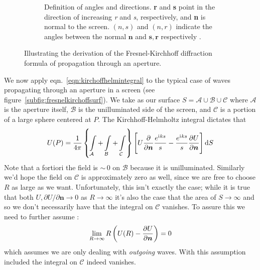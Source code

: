 \begin{figure}
\begin{subfigure}[b]{\subfigwidth}
        \caption{Definition of angles and directions. \textbf{r} and \textbf{s} point in the direction of increasing \textit{r}
        and \textit{s}, respectively, and \textbf{n} is normal to the screen. \((n,s)\) and \((n,r)\) indicate the angles between the normal \(\bm{n}\) and \(\bm{s}, \bm{r}\) respectively \cite{Ivanov2016ElementsOD}.}\label{subfig:fresnelkirchoffangles}
    \end{subfigure}
    \caption{Illustrating the derivation of the Fresnel-Kirchhoff diffraction formula of propagation through an aperture.}\label{fig:fresnelkirchoff}
\end{figure}

We now apply eqn.~\eqref{eqn:kirchoffhelmintegral} to the typical case of waves propagating through an aperture in a screen (see figure~\ref{subfig:fresnelkirchoffsurf}).
%
We take as our surface \(S = \mathcal{A} \cup \mathcal{B} \cup \mathcal{C}\) where \(\mathcal{A}\) is the aperture itself, \(\mathcal{B}\) is the unilluminated side of the screen, and \(\mathcal{C}\) is a portion of a large sphere centered at \(P\).
%
The Kirchhoff-Helmholtz integral dictates that 
%
\begin{equation}
    U(P) = \frac{1}{4 \pi} \left\{ \int\limits_{\mathcal{A}}  + \int\limits_{\mathcal{B}} + \int\limits_{\mathcal{C}}  \right\} \left[ U \pdv{}{\bm{n}} \frac{e^{\iu k s}}{s} - \frac{e^{\iu k s}}{s} \pdv{U}{\bm{n}} \right] \dif S
\end{equation}
%
Note that a fortiori the field is \(\sim\,\)0 on \(\mathcal{B}\) because it is unilluminated.
%
Similarly we'd hope the field on \(\mathcal{C}\) is approximately zero as well, since we are free to choose \(R\) as large as we want.
%
Unfortunately, this isn't exactly the case; while it is true that both \(U, \partial U/ \partial \bm{n} \rightarrow 0\) as \(R \rightarrow \infty\) it's also the case that the area of \(S \rightarrow \infty\) and so we don't necessarily have that the integral on \(\mathcal{C}\) vanishes.
%
To assure this we need to further assume :
%
\begin{equation}
    \lim_{R \rightarrow \infty} R \left( U(R) - \pdv{U}{\bm{n}} \right)  = 0
\end{equation}
%
which assumes we are only dealing with \textit{outgoing} waves.
%
With this assumption included the integral on \(\mathcal{C}\) indeed vanishes.

